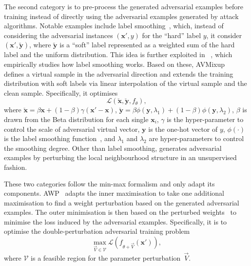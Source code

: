 The second category is to pre-process the generated adversarial examples before training instead of directly using the adversarial examples generated by attack algorithms.
Notable examples include label smoothing~\cite{chen2020robust,szegedy2016rethinking}, which, instead of considering the adversarial instances $(\mathbf{x}',y)$ for the ``hard'' label $y$, it consider $(\mathbf{x}',\mathbf{\tilde{y}})$, where $\mathbf{\tilde{y}}$ is a ``soft'' label represented as a weighted sum of the hard label and the uniform distribution. 
This idea is further exploited in ~\cite{muller2019does}, which empirically studies how label smoothing works.
Based on these, AVMixup~\cite{lee2020adversarial,zhang2020does} defines a  virtual sample in the adversarial direction and extends the training distribution with soft labels via linear interpolation of the virtual sample and the clean sample.
Specifically, it optimises 
\begin{equation}
\mathcal{L}(\mathbf{\check x},\mathbf{\check y}, f_\theta),
\end{equation}
where $\mathbf{\check x}=\beta\mathbf{x}+(1-\beta)\gamma(\mathbf{x}'-\mathbf{x})$, $\mathbf{\check y}=\beta\phi(\mathbf{y},\lambda_1)+(1-\beta)\phi(\mathbf{y},\lambda_2)$, 
$\beta$ is drawn from the Beta distribution for each single $\mathbf{x}_i$, $\gamma$ is the hyper-parameter to control the scale of adversarial virtual vector, $\textbf{y}$ is the one-hot vector of $y$,  $\phi(\cdot)$ is the label smoothing function~\cite{szegedy2016rethinking}, and $\lambda_1$ and $\lambda_2$ are hyper-parameters to control the smoothing degree. 
Other than label smoothing, \cite{NEURIPS2019_d8700cbd} generates adversarial examples by perturbing the local neighbourhood structure in an unsupervised fashion.


These two categories follow the min-max formalism and only adapt its components. AWP~\cite{wu2020adversarial} adapts the inner maximisation to take one additional maximisation to find a weight perturbation based on the generated adversarial examples. The outer minimisation is then based on the perturbed weights~\cite{devries2017improved} to minimise the loss induced by the adversarial examples.
Specifically, it is to optimise the double-perturbation adversarial training problem
\begin{equation}
\label{eq_awp}
    \max_{\vec{V}\in\mathcal{V}}\mathcal{L}( f_{\theta+\vec{V}}(\mathbf{x}') ),
\end{equation}
where $\mathcal{V}$ is a feasible region for the parameter perturbation~$\vec{V}$. 



